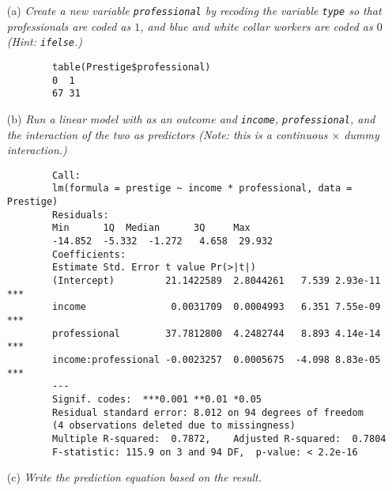 \documentclass[12pt,letterpaper]{article}
\begin{document}
	\newpage
	\begin{enumerate}
		
		\item [(a)]
		\textit{Create a new variable \texttt{professional} by recoding the variable \texttt{type} so that professionals are coded as $1$, and blue and white collar workers are coded as $0$ (Hint: \texttt{ifelse}.)}
		
		 
							
		\begin{verbatim}	
		table(Prestige$professional)
		0  1 
		67 31 
		\end{verbatim}
		
				 		\vspace{1cm}
		
		\item [(b)]
		\textit{Run a linear model with  as an outcome and \texttt{income}, \texttt{professional}, and the interaction of the two as predictors (Note: this is a continuous $\times$ dummy interaction.)}
				 		\vspace{.25cm}
				 		
				 				 
		\begin{verbatim}
		Call:
		lm(formula = prestige ~ income * professional, data = Prestige)
		Residuals:
		Min      1Q  Median      3Q     Max 
		-14.852  -5.332  -1.272   4.658  29.932 
		Coefficients:
		Estimate Std. Error t value Pr(>|t|)    
		(Intercept)         21.1422589  2.8044261   7.539 2.93e-11 ***
		income               0.0031709  0.0004993   6.351 7.55e-09 ***
		professional        37.7812800  4.2482744   8.893 4.14e-14 ***
		income:professional -0.0023257  0.0005675  -4.098 8.83e-05 ***
		---
		Signif. codes:  ***0.001 **0.01 *0.05
		Residual standard error: 8.012 on 94 degrees of freedom
		(4 observations deleted due to missingness)
		Multiple R-squared:  0.7872,	Adjusted R-squared:  0.7804 
		F-statistic: 115.9 on 3 and 94 DF,  p-value: < 2.2e-16
		\end{verbatim}
		\newpage
		\item [(c)]
		\textit{Write the prediction equation based on the result.}
		

\end{enumerate}
\end{document}
